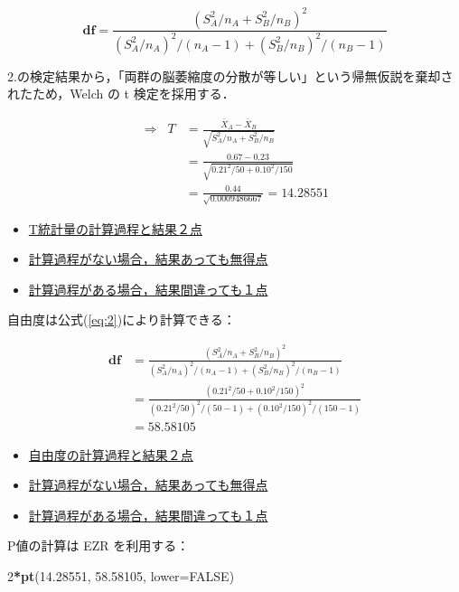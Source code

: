 \documentclass[11pt,]{problemset}
\newenvironment{Shaded}{\begin{snugshade}}{\end{snugshade}}
\newcommand{\DataTypeTok}[1]{\textcolor[rgb]{0.13,0.29,0.53}{#1}}
\newcommand{\DecValTok}[1]{\textcolor[rgb]{0.00,0.00,0.81}{#1}}
\newcommand{\FloatTok}[1]{\textcolor[rgb]{0.00,0.00,0.81}{#1}}
\newcommand{\KeywordTok}[1]{\textcolor[rgb]{0.13,0.29,0.53}{\textbf{#1}}}
\newcommand{\NormalTok}[1]{#1}
\newcommand{\OperatorTok}[1]{\textcolor[rgb]{0.81,0.36,0.00}{\textbf{#1}}}
\newcommand{\OtherTok}[1]{\textcolor[rgb]{0.56,0.35,0.01}{#1}}
\begin{document}
\begin{equation}
\label{eq:2}
\mathbf{df} = \frac{(S^2_A/n_A + S^2_B/n_B)^2}{(S_A^2/n_A)^2/(n_A-1)+(S_B^2/n_B)^2/(n_B-1)}
\end{equation}

2.の検定結果から，「両群の脳萎縮度の分散が等しい」という帰無仮説を棄却されたため，Welch
の t 検定を採用する．

\[
\begin{aligned}
\Rightarrow\;\; T & = \frac{\bar{X}_A - \bar{X}_B}{\sqrt{S^2_A/n_A + S^2_B/n_B}} \\ 
                  & = \frac{0.67 - 0.23}{\sqrt{0.21^2/50 + 0.10^2/150}} \\ 
                  & = \frac{0.44}{\sqrt{0.0009486667}} = 14.28551
\end{aligned}
\]

\begin{itemize}
\item
  \underline{T統計量の計算過程と結果２点}
\item
  \underline{計算過程がない場合，結果あっても無得点}
\item
  \underline{計算過程がある場合，結果間違っても１点}
\end{itemize}

自由度は公式(\ref{eq:2})により計算できる：

\[
\begin{aligned}
\mathbf{df} & = \frac{(S^2_A/n_A + S^2_B/n_B)^2}{(S_A^2/n_A)^2/(n_A-1)+(S_B^2/n_B)^2/(n_B-1)} \\
            & = \frac{(0.21^2/50 + 0.10^2/150)^2}{(0.21^2/50)^2/(50-1)+(0.10^2/150)^2/(150-1)} \\
            & = 58.58105
\end{aligned}
\]

\begin{itemize}
\item
  \underline{自由度の計算過程と結果２点}
\item
  \underline{計算過程がない場合，結果あっても無得点}
\item
  \underline{計算過程がある場合，結果間違っても１点}
\end{itemize}

P値の計算は EZR を利用する：

\begin{Shaded}
\begin{Highlighting}[]
\DecValTok{2}\OperatorTok{*}\KeywordTok{pt}\NormalTok{(}\FloatTok{14.28551}\NormalTok{, }\FloatTok{58.58105}\NormalTok{, }\DataTypeTok{lower=}\OtherTok{FALSE}\NormalTok{)}
\end{Highlighting}
\end{Shaded}
\end{document}
